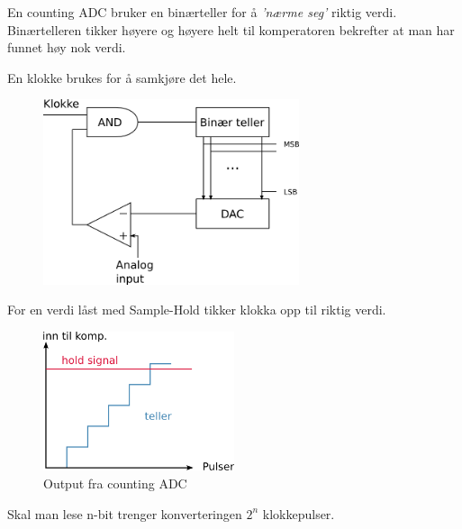 En counting ADC bruker en binærteller for å \emph{'nærme seg'} riktig verdi.
Binærtelleren tikker høyere og høyere helt til komperatoren bekrefter at
man har funnet høy nok verdi.

En klokke brukes for å samkjøre det hele.


\begin{figure}[H]
  \centering
  \caption{}
  \includegraphics[width=0.67\textwidth]{./img/countingADC}
\end{figure}

For en verdi låst med Sample-Hold tikker klokka opp til riktig verdi.

\begin{figure}[H]
  \centering
  \caption{Output fra counting ADC}
  \includegraphics[width=0.5\textwidth]{./img/countingout}
\end{figure}

Skal man lese n-bit trenger konverteringen $2^n$ klokkepulser.
